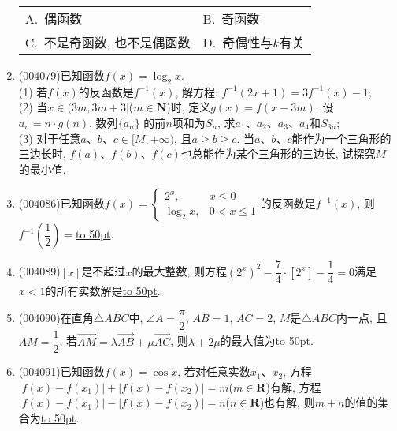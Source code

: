 \documentclass[10pt,a4paper]{article}
\newcommand{\blank}[1]{\underline{\hbox to #1pt{}}}
\newcommand{\twoch}[4]{\par\begin{tabular}{p{.46\textwidth}p{.46\textwidth}}
A.~#1& B.~#2\\
C.~#3& D.~#4
\end{tabular}}
\begin{document}
\begin{enumerate}[1.]
\begin{center}
\end{center}
\twoch{偶函数}{奇函数}{不是奇函数, 也不是偶函数}{奇偶性与$k$有关}
\item {\tiny (004079)}已知函数$f(x)=\log_2x$.\\
(1) 若$f(x)$的反函数是$f^{-1}(x)$, 解方程: $f^{-1}(2x+1)=3f^{-1}(x)-1$;\\
(2) 当$x\in (3m, 3m+3]$($m\in \mathbf{N}$)时, 定义$g(x)=f(x-3m)$. 设$a_n=n\cdot g(n)$, 数列$\{a_n\}$ 的前$n$项和为$S_n$, 求$a_1$、$a_2$、$a_3$、$a_4$和$S_{3n}$;\\
(3) 对于任意$a$、$b$、$c\in [M,+\infty)$, 且$a\ge b\ge c$. 当$a$、$b$、$c$能作为一个三角形的三边长时, $f(a)$、$f(b)$、$f(c)$也总能作为某个三角形的三边长, 试探究$M$的最小值.
\item {\tiny (004086)}已知函数$f(x)=\begin{cases} 2^x, & x\le 0 \\  \log_2x, & 0<x\le 1 \end{cases}$的反函数是$f^{-1}(x)$, 则$f^{-1}(\dfrac 12)=$\blank{50}.
\item {\tiny (004089)}$[x]$是不超过$x$的最大整数, 则方程$(2^x)^2-\dfrac 74\cdot [2^x]-\dfrac 14=0$满足$x<1$的所有实数解是\blank{50}.
\item {\tiny (004090)}在直角$\triangle ABC$中, $\angle A=\dfrac{\pi}2$, $AB=1$, $AC=2$, $M$是$\triangle ABC$内一点, 且$AM=\dfrac 12$, 若$\overrightarrow{AM}=\lambda \overrightarrow{AB}+\mu \overrightarrow{AC}$, 则$\lambda +2\mu$的最大值为\blank{50}.
\item {\tiny (004091)}已知函数$f(x)=\cos x$, 若对任意实数$x_1$、$x_2$, 方程$|f(x)-f(x_1)|+|f(x)-f(x_2)|=m$($m\in \mathbf{R}$)有解, 方程$|f(x)-f(x_1)|-|f(x)-f(x_2)|=n$($n\in \mathbf{R}$)也有解, 则$m+n$的值的集合为\blank{50}.

\end{enumerate}
\end{document}
